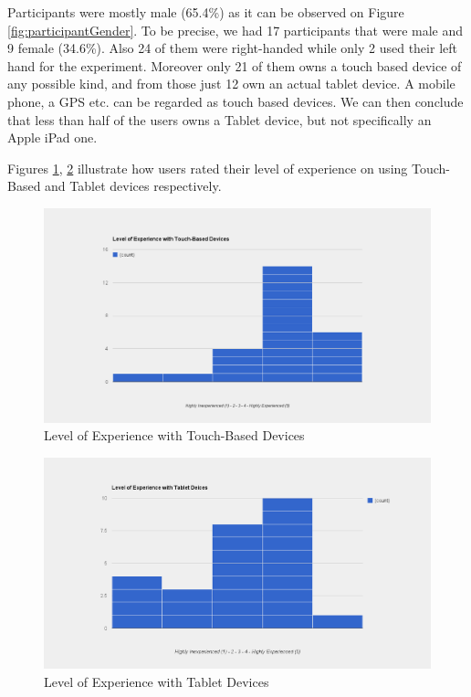 Participants were mostly male (65.4\%) as it can be observed on Figure \ref{fig:participantGender}. To be precise, we had 17 participants that were male and 9 female (34.6\%). Also 24 of them were right-handed while only 2 used their left hand for the experiment. Moreover only 21 of them owns a touch based device of any possible kind, and from those just 12 own an actual tablet device. A mobile phone, a GPS etc. can be regarded as touch based devices. We can then conclude that less than half of the users owns a Tablet device, but not specifically an Apple iPad one.

Figures \ref{fig:experienceTouch}, \ref{fig:experienceTablet} illustrate how users rated their level of experience on using Touch-Based and Tablet devices respectively.

\begin{figure}[H]
\centering
\includegraphics[scale=0.3]{figures/experienceTouch.png}
\caption{Level of Experience with Touch-Based Devices}
\label{fig:experienceTouch}
\end{figure}

\begin{figure}[H]
\centering
\includegraphics[scale=0.3]{figures/experienceTablet.png}
\caption{Level of Experience with Tablet Devices}
\label{fig:experienceTablet}
\end{figure}

